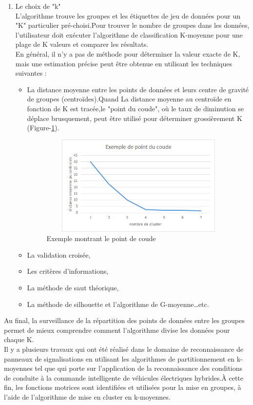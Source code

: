 \begin{enumerate}
\item Le choix de "k"\\ 
L'algorithme trouve les groupes et les étiquettes de jeu de données pour un "K" particulier pré-choisi.Pour trouver le nombre de groupes dans les données, l'utilisateur doit exécuter l'algorithme de classification K-moyenne pour une plage de K valeurs et comparer les résultats.\\
En général, il n'y a pas de méthode pour déterminer la valeur exacte de K, mais une estimation précise peut être obtenue en utilisant les techniques suivantes :
\begin{itemize}
\item La distance moyenne entre les points de données et leurs centre de gravité de groupes (centroïdes).Quand La distance moyenne au centroïde en fonction de K est tracée,le "point du coude", où le taux de diminution se déplace brusquement, peut être utilisé pour déterminer grossièrement K (Figure-\ref{fig:21}).
    
\begin{figure}[h!]
      \centering
      \includegraphics[width=12cm,height=5cm]{images/graph.png}
    \caption{Exemple montrant le point de coude}
    \label{fig:21}
\end{figure}
\item La validation croisée, 
\item Les critères d'informations,
\item La méthode de saut théorique,
\item La méthode de silhouette et l'algorithme de G-moyenne…etc.
\end{itemize}
\end{enumerate}

Au final, la surveillance de la répartition des points de données entre les groupes permet de mieux comprendre comment l’algorithme divise les données pour chaque K.\\

Il y a plusieurs travaux qui ont été réalisé dans le domaine de reconnaissance de panneaux de signalisations en utilisant les algorithmes de partitionnement en k-moyennes tel que \cite{29} qui porte sur l'application de la reconnaissance des conditions de conduite à la commande intelligente de véhicules électriques hybrides.À cette fin, les fonctions motrices sont identifiées et utilisées pour la mise en groupes, à l’aide de l’algorithme de mise en cluster en k-moyennes.

